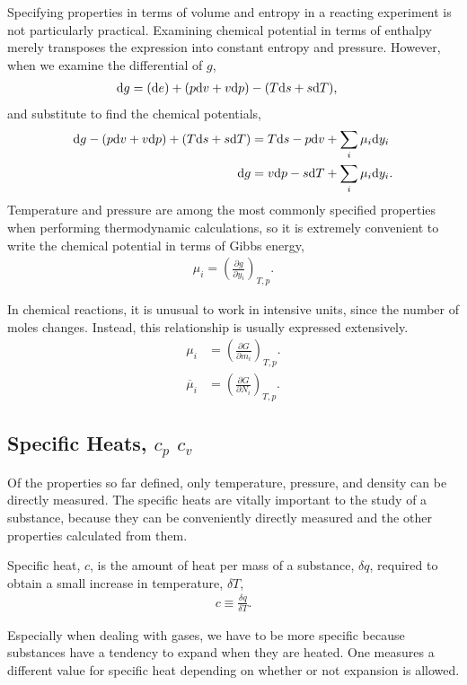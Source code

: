 Specifying properties in terms of volume and entropy in a reacting experiment is not particularly practical.  Examining chemical potential in terms of enthalpy merely transposes the expression into constant entropy and pressure.  However, when we examine the differential of $g$,
\begin{align*}
\mathrm{d} g &= (\mathrm{d} e) + (p\mathrm{d} v + v \mathrm{d} p) - (T \mathrm{d} s + s \mathrm{d} T),
\end{align*}
and substitute to find the chemical potentials,
\begin{align*}
\mathrm{d} g - (p \mathrm{d} v + v \mathrm{d} p) + (T \mathrm{d} s + s \mathrm{d} T) &= T \mathrm{d} s - p \mathrm{d} v + \sum_i \mu_i \mathrm{d} y_i\\
\mathrm{d} g &= v \mathrm{d} p - s \mathrm{d} T + \sum_i \mu_i \mathrm{d} y_i.
\end{align*}
Temperature and pressure are among the most commonly specified properties when performing thermodynamic calculations, so it is extremely convenient to write the chemical potential in terms of Gibbs energy,
\begin{align}
\mu_i = \left(\frac{\partial g}{\partial y_i}\right)_{T,p}.
\end{align}

In chemical reactions, it is unusual to work in intensive units, since the number of moles changes.  Instead, this relationship is usually expressed extensively.
\begin{align}
\mu_i &= \left(\frac{\partial G}{\partial m_i}\right)_{T,p}.\\
\overline{\mu}_i &= \left(\frac{\partial G}{\partial N_i}\right)_{T,p}.
\end{align}

\subsection{Specific Heats, $c_p$ $c_v$}\label{sec:intro:c}

Of the properties so far defined, only temperature, pressure, and density can be directly measured.  The specific heats are vitally important to the study of a substance, because they can be conveniently directly measured and the other properties calculated from them.

Specific heat, $c$, is the amount of heat per mass of a substance, $\delta q$, required to obtain a small increase in temperature, $\delta T$,
\begin{align}
c \equiv \frac{\delta q}{\delta T}.
\end{align}

Especially when dealing with gases, we have to be more specific because substances have a tendency to expand when they are heated.  One measures a different value for specific heat depending on whether or not expansion is allowed. 

